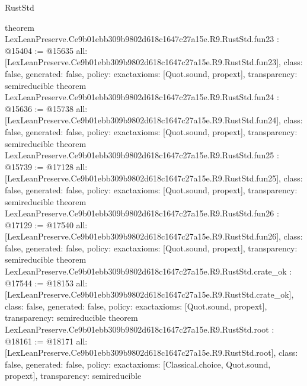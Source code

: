 \begin{lexlean}{RustStd}
\begin{coremodule}
{}
theorem LexLeanPreserve.Ce9b01ebb309b9802d618c1647c27a15e.R9.RustStd.fun23 : @15404 := @15635 {
  all: [LexLeanPreserve.Ce9b01ebb309b9802d618c1647c27a15e.R9.RustStd.fun23],
  class: false,
  generated: false,
  policy: exact{axioms: [Quot.sound, propext]},
  transparency: semireducible
}
theorem LexLeanPreserve.Ce9b01ebb309b9802d618c1647c27a15e.R9.RustStd.fun24 : @15636 := @15738 {
  all: [LexLeanPreserve.Ce9b01ebb309b9802d618c1647c27a15e.R9.RustStd.fun24],
  class: false,
  generated: false,
  policy: exact{axioms: [Quot.sound, propext]},
  transparency: semireducible
}
theorem LexLeanPreserve.Ce9b01ebb309b9802d618c1647c27a15e.R9.RustStd.fun25 : @15739 := @17128 {
  all: [LexLeanPreserve.Ce9b01ebb309b9802d618c1647c27a15e.R9.RustStd.fun25],
  class: false,
  generated: false,
  policy: exact{axioms: [Quot.sound, propext]},
  transparency: semireducible
}
theorem LexLeanPreserve.Ce9b01ebb309b9802d618c1647c27a15e.R9.RustStd.fun26 : @17129 := @17540 {
  all: [LexLeanPreserve.Ce9b01ebb309b9802d618c1647c27a15e.R9.RustStd.fun26],
  class: false,
  generated: false,
  policy: exact{axioms: [Quot.sound, propext]},
  transparency: semireducible
}
theorem LexLeanPreserve.Ce9b01ebb309b9802d618c1647c27a15e.R9.RustStd.crate_ok : @17544 := @18153 {
  all: [LexLeanPreserve.Ce9b01ebb309b9802d618c1647c27a15e.R9.RustStd.crate_ok],
  class: false,
  generated: false,
  policy: exact{axioms: [Quot.sound, propext]},
  transparency: semireducible
}
theorem LexLeanPreserve.Ce9b01ebb309b9802d618c1647c27a15e.R9.RustStd.root : @18161 := @18171 {
  all: [LexLeanPreserve.Ce9b01ebb309b9802d618c1647c27a15e.R9.RustStd.root],
  class: false,
  generated: false,
  policy: exact{axioms: [Classical.choice, Quot.sound, propext]},
  transparency: semireducible
}


\end{coremodule}
\end{lexlean}

